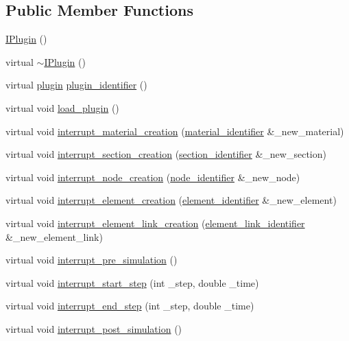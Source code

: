 \subsection*{Public Member Functions}
\begin{DoxyCompactItemize}
\item 
\hyperlink{classIPlugin_a5c43c107b8a3109755cc0e5a26fb5642}{I\+Plugin} ()
\item 
virtual \hyperlink{classIPlugin_a92763c9985354dc46cae781e3873a6b2}{$\sim$\+I\+Plugin} ()
\item 
virtual \hyperlink{plugins_8hh_af34747f68f9b0963dea6e8f3c659659c}{plugin} \hyperlink{classIPlugin_adcfd0fb076b3d72246d1dbdccecc69d6}{plugin\+\_\+identifier} ()
\item 
virtual void \hyperlink{classIPlugin_aec5e64955d7c36f033651ff4d93d6ebb}{load\+\_\+plugin} ()
\item 
virtual void \hyperlink{classIPlugin_ab5917f9b11793d640a5c386f8107033a}{interrupt\+\_\+material\+\_\+creation} (\hyperlink{structmaterial__identifier}{material\+\_\+identifier} \&\+\_\+new\+\_\+material)
\item 
virtual void \hyperlink{classIPlugin_ac247d76db1677abefface875defac756}{interrupt\+\_\+section\+\_\+creation} (\hyperlink{structsection__identifier}{section\+\_\+identifier} \&\+\_\+new\+\_\+section)
\item 
virtual void \hyperlink{classIPlugin_a100d2a3202e1117c81ba40da77421b9d}{interrupt\+\_\+node\+\_\+creation} (\hyperlink{structnode__identifier}{node\+\_\+identifier} \&\+\_\+new\+\_\+node)
\item 
virtual void \hyperlink{classIPlugin_ac0e36a76522f4d6e2fd33d82abb25770}{interrupt\+\_\+element\+\_\+creation} (\hyperlink{structelement__identifier}{element\+\_\+identifier} \&\+\_\+new\+\_\+element)
\item 
virtual void \hyperlink{classIPlugin_acea743d2a1b418d671d980418787ee3c}{interrupt\+\_\+element\+\_\+link\+\_\+creation} (\hyperlink{structelement__link__identifier}{element\+\_\+link\+\_\+identifier} \&\+\_\+new\+\_\+element\+\_\+link)
\item 
virtual void \hyperlink{classIPlugin_af3a42960590594e2623fc2592c925de3}{interrupt\+\_\+pre\+\_\+simulation} ()
\item 
virtual void \hyperlink{classIPlugin_ab6128940f6d722d57f26c61b56d2b213}{interrupt\+\_\+start\+\_\+step} (int \+\_\+step, double \+\_\+time)
\item 
virtual void \hyperlink{classIPlugin_ada2dcfc2d2b1a67b29fe75b30575fbe6}{interrupt\+\_\+end\+\_\+step} (int \+\_\+step, double \+\_\+time)
\item 
virtual void \hyperlink{classIPlugin_a8de731011e31780ece2990086db410a0}{interrupt\+\_\+post\+\_\+simulation} ()
\end{DoxyCompactItemize}
